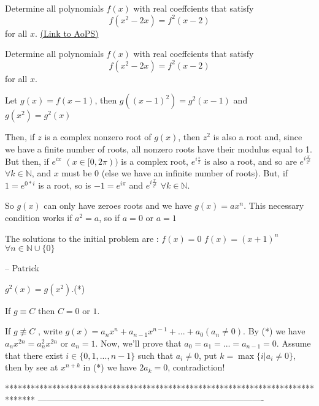 \begin{problem}
	Determine all polynomials $f (x)$ with real coeffcients that satisfy
\[f (x^{2}-2x) = f^{2}(x-2)\]
for all $x.$
	\flushright \href{https://artofproblemsolving.com/community/c6h151180}{(Link to AoPS)}
\end{problem}



\begin{solution}
	\begin{tcolorbox}Determine all polynomials $f (x)$ with real coeffcients that satisfy
\[f (x^{2}-2x) = f^{2}(x-2) \]
for all $x.$\end{tcolorbox}

Let $g(x)=f(x-1)$, then $g((x-1)^{2})=g^{2}(x-1)$ and $g(x^{2})=g^{2}(x)$

Then, if $z$ is a complex nonzero root of $g(x)$, then $z^{2}$ is also a root and, since we have a finite number of roots, all nonzero roots have their modulus equal to 1.
But then, if $e^{ix}$ $(x\in[0,2\pi))$ is a complex root, $e^{i\frac{x}{2}}$ is also a root, and so are $e^{i\frac{x}{2^{k}}}$ $\forall k\in\mathbb{N}$, and $x$ must be 0 (else we have an infinite number of roots). But, if $1=e^{0*i}$ is a root, so is $-1=e^{i\pi}$ and $e^{i\frac{\pi}{2^{k}}}$ $\forall k\in\mathbb{N}$.

So $g(x)$ can only have zeroes roots and we have $g(x)=ax^{n}$. This necessary condition works if $a^{2}=a$, so if $a=0$ or $a=1$

The solutions to the initial problem are :
$f(x)=0$
$f(x)=(x+1)^{n}$ $\forall n\in\mathbb{N}\cup\{0\}$

-- 
Patrick
\end{solution}



\begin{solution}
	$g^{2}(x)=g(x^{2}).$(*)

If $g\equiv C$ then $C=0$ or $1$.

If $g\not\equiv C$ , write $g(x)=a_{n}x^{n}+a_{n-1}x^{n-1}+...+a_{0}(a_{n}\not = 0)$. By (*) we have $a_{n}x^{2n}=a_{n}^{2}x^{2n}$ or $a_{n}=1$. Now, we'll prove that $a_{0}=a_{1}=...=a_{n-1}=0$. Assume that there exist $i\in\{0,1,...,n-1\}$ such that $a_{i}\not = 0$, put $k=\max \{i|a_{i}\not = 0\}$, then by see at $x^{n+k}$ in (*) we have $2a_{k}=0$, contradiction!
\end{solution}
*******************************************************************************
-------------------------------------------------------------------------------

